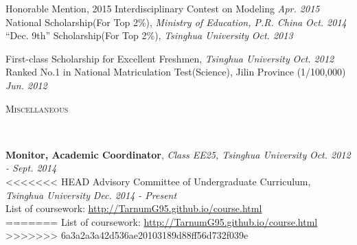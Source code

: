 \documentclass[9pt]{article}
\newenvironment{changemargin}[2]{%
  \begin{list}{}{%
    \setlength{\topsep}{0pt}%
    \setlength{\leftmargin}{#1}%
    \setlength{\rightmargin}{#2}%
    \setlength{\listparindent}{\parindent}%
    \setlength{\itemindent}{\parindent}%
    \setlength{\parsep}{\parskip}%
  }%
  \item[]}{\end{list}
}
\newcommand{\lineover}{
	\begin{changemargin}{-0.05in}{-0.05in}
		\vspace*{-8pt}
		\hrulefill \\
		\vspace*{-2pt}
	\end{changemargin}
}
\newcommand{\header}[1]{
	\begin{changemargin}{-0.5in}{-0.5in}
		\scshape{#1}\\
  	\lineover
	\end{changemargin}
}
\newenvironment{body} {
	\vspace*{-16pt}
	\begin{changemargin}{-0.25in}{-0.5in}
  }	
	{\end{changemargin}
}
\begin{document}
\begin{body}
	\vspace{14pt}
	Honorable Mention, 2015 Interdisciplinary Contest on Modeling \hfill{} \emph{Apr. 2015}\\
	\smallskip
	National Scholarship(For Top 2\%), \emph{Ministry of Education, P.R. China} \hfill{} \emph{Oct. 2014}\\
	\smallskip
	``Dec. 9th'' Scholarship(For Top 2\%), \emph{Tsinghua University} \hfill{} \emph{Oct. 2013}\\
	\smallskip

	First-class Scholarship for Excellent Freshmen, \emph{Tsinghua University} \hfill{} \emph{Oct. 2012}\\
	\smallskip
	Ranked No.1 in National Matriculation Test(Science), Jilin Province (1/100,000) \hfill{} \emph{Jun. 2012}
\end{body}

\smallskip
\smallskip






\header{Miscellaneous}

\begin{body}
	\vspace{14pt}
	\textbf {Monitor, Academic Coordinator}, \emph{Class EE25, Tsinghua University} \hfill \emph{Oct. 2012 - Sept. 2014}\\
	\smallskip
<<<<<<< HEAD
	Advisory Committee of Undergraduate Curriculum,  \emph{Tsinghua University} \hfill \emph{Dec. 2014 - Present}\\
	\smallskip
	List of coursework: \href{http://tarnumg95.github.io/course.html}{http://TarnumG95.github.io/course.html}\\
=======
	List of coursework: \href{tarnumg95.github.io/course.html}{http://TarnumG95.github.io/course.html}\\
>>>>>>> 6a3a2a3a42d536ae20103189d88ff56d732f039e


\end{body}

\smallskip
\smallskip
\end{document}
